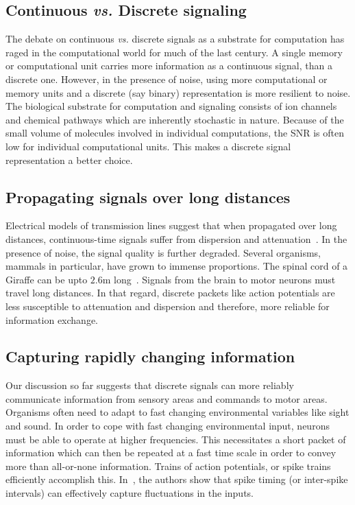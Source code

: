 \documentclass[10pt,onecolumn]{article}
\begin{document}
    \subsection*{Continuous \textit{vs.} Discrete signaling}
    \label{sec:continuous_vs_discrete_signaling}
    The debate on continuous \textit{vs.} discrete signals as a substrate for computation has raged in the computational world for much of the last century.
    A single memory or computational unit carries more information as a continuous signal, than a discrete one.
    However, in the presence of noise, using more computational or memory units and a discrete (say binary) representation is more resilient to noise.
    The biological substrate for computation and signaling consists of ion channels and chemical pathways which are inherently stochastic in nature.
    Because of the small volume of molecules involved in individual computations, the \ac{SNR} is often low for individual computational units.
    This makes a discrete signal representation a better choice.

    \subsection*{Propagating signals over long distances}
    \label{sec:propagating_signals_over_long_distances}

    Electrical models of transmission lines suggest that when propagated over long distances, continuous-time signals suffer from dispersion and attenuation~\cite{roychowdhury1991efficient}.
    In the presence of noise, the signal quality is further degraded.
    Several organisms, mammals in particular, have grown to immense proportions.
    The spinal cord of a Giraffe can be upto $2.6$m long~\cite{badlangana2007observations}.
    Signals from the brain to motor neurons must travel long distances.
    In that regard, discrete packets like action potentials are less susceptible to attenuation and dispersion and therefore, more reliable for information exchange.

    \subsection*{Capturing rapidly changing information}
    \label{sec:capturing_rapidly_changing_information}

    Our discussion so far suggests that discrete signals can more reliably communicate information from sensory areas and commands to motor areas.
    Organisms often need to adapt to fast changing environmental variables like sight and sound.
    In order to cope with fast changing environmental input, neurons must be able to operate at higher frequencies.
    This necessitates a short packet of information which can then be repeated at a fast time scale in order to convey more than all-or-none information.
    Trains of action potentials, or spike trains efficiently accomplish this.
    In~\cite{mainen1995reliability}, the authors show that spike timing (or inter-spike intervals) can effectively capture fluctuations in the inputs.
\end{document}
